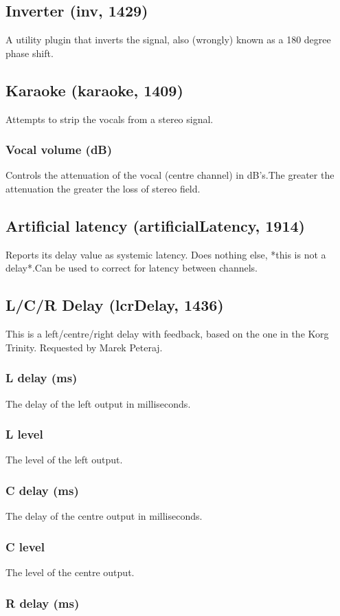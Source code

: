 \documentclass[11pt]{article}
\begin{document}
      \subsection{Inverter (inv, 1429)\label{inv}\label{id1429}}
A utility plugin that inverts the signal, also (wrongly) known as a 180 degree phase shift.\subsection{Karaoke (karaoke, 1409)\label{karaoke}\label{id1409}}
Attempts to strip the vocals from a stereo signal.\subsubsection*{Vocal volume (dB)}
Controls the attenuation of the vocal (centre channel) in dB's.The greater the attenuation the greater the loss of stereo field.\subsection{Artificial latency (artificialLatency, 1914)\label{artificialLatency}\label{id1914}}
Reports its  delay value as systemic latency. Does nothing else, *this is not a delay*.Can be used to correct for latency between channels.\subsection{L/C/R Delay (lcrDelay, 1436)\label{lcrDelay}\label{id1436}}
This is a left/centre/right delay with feedback, based on the one in the Korg Trinity. Requested by Marek Peteraj.\subsubsection*{L delay (ms)}
The delay of the left output in milliseconds.\subsubsection*{L level}
The level of the left output.\subsubsection*{C delay (ms)}
The delay of the centre output in milliseconds.\subsubsection*{C level}
The level of the centre output.\subsubsection*{R delay (ms)}
\end{document}
